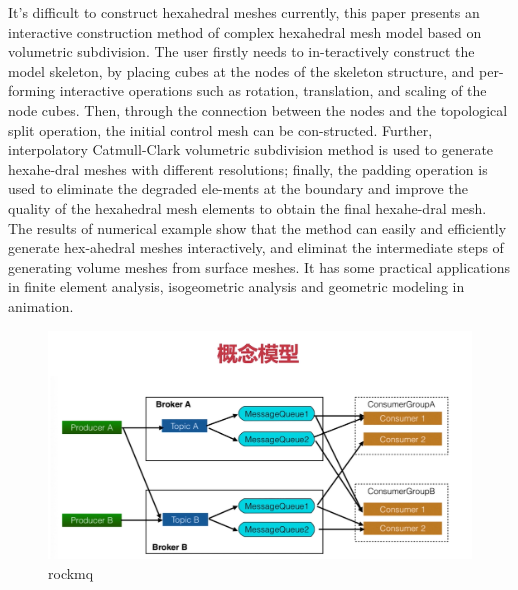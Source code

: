It’s difficult to construct hexahedral meshes currently, this paper presents an interactive construction method of complex hexahedral mesh model based on volumetric subdivision. The user firstly needs to in-teractively construct the model skeleton, by placing cubes at the nodes of the skeleton structure, and per-forming interactive operations such as rotation, translation, and scaling of the node cubes. Then, through the connection between the nodes and the topological split operation, the initial control mesh can be con-structed. Further, interpolatory Catmull-Clark volumetric subdivision method is used to generate hexahe-dral meshes with different resolutions; finally, the padding operation is used to eliminate the degraded ele-ments at the boundary and improve the quality of the hexahedral mesh elements to obtain the final hexahe-dral mesh. The results of numerical example show that the method can easily and efficiently generate hex-ahedral meshes interactively, and eliminat the intermediate steps of generating volume meshes from surface meshes. It has some practical applications in finite element analysis, isogeometric analysis and geometric modeling in animation.

\begin{figure}
	\centering
	\includegraphics[width=0.7\linewidth]{figures/rockmq.png}
	\caption{rockmq}
	\label{fig:rockmq}
\end{figure}
